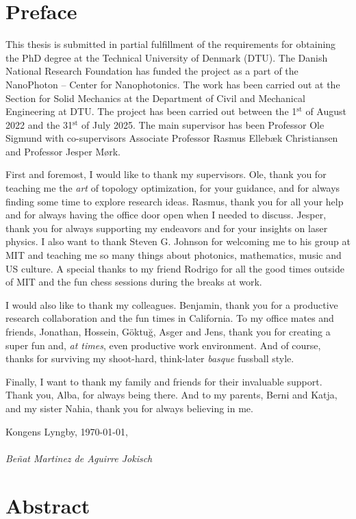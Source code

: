 \chapter*{Preface}
This thesis is submitted in partial fulfillment of the requirements for obtaining
the PhD degree at the Technical University of Denmark
(DTU). The Danish National Research Foundation has funded the project as a part of
the NanoPhoton -- Center for Nanophotonics. The work has been carried out at the
Section for Solid Mechanics at the Department of Civil and Mechanical Engineering
at DTU. The project has been carried out between the 1$^\text{st}$ of August 2022 and the 31$^\text{st}$
of July 2025. The main supervisor has been Professor Ole Sigmund with co-supervisors Associate Professor Rasmus Ellebæk Christiansen and Professor Jesper
Mørk.

First and foremost, I would like to thank my supervisors. Ole, thank you for teaching me the \emph{art} of topology optimization, for your guidance, and for always
finding some time to explore research ideas. Rasmus, thank you for all your help and for always having the office door open when I needed to discuss.
Jesper, thank you for always supporting my endeavors and for your insights on laser physics. I also want to thank Steven G. Johnson for welcoming me to his group at MIT and teaching me so many things about photonics,
mathematics, music and US culture. A special thanks to my friend Rodrigo for all the good times outside of MIT and the fun chess sessions 
during the breaks at work.

I would also like to thank my colleagues. Benjamin, thank you
for a productive research collaboration and the fun times in California. To my office mates and friends, Jonathan, Hossein, Göktuğ, Asger and Jens, thank you for creating 
a super fun and, \emph{at times}, even productive work environment. And of course, thanks for surviving my shoot-hard, think-later \emph{basque} fussball style.


Finally, I want to thank my family and friends for their invaluable support. Thank you, Alba, for always being there. 
And to my parents, Berni and Katja, and my sister Nahia, thank you for always believing in me.

\noindent Kongens Lyngby, \today,\\
\vspace{0.1cm}\\
\noindent \textit{Beñat Martinez de Aguirre Jokisch}

\chapter*{Abstract}

